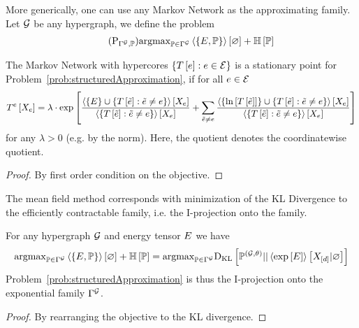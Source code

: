 More generically, one can use any Markov Network as the approximating family. %
Let $\mathcal{G}$ be any hypergraph, we define the problem
\begin{align}\tag{$\mathrm{P}_{\mnexpfamily, \probtensor}$}\label{prob:structuredApproximation}
	\argmax_{\probtensor\in \mnexpfamily} \contractionof{\{\energytensor, \probtensor\}}{\varnothing} + \sentropyof{\probtensor}
\end{align}

\begin{theorem}
	The Markov Network with hypercores $\{ T\left[e\right] : e\in\mathcal{E} \}$ is a stationary point for Problem~\ref{prob:structuredApproximation}, if for all $e\in\mathcal{E}$
	\begin{align*}
	T^{e}\left[X_{e}\right]
	= \lambda\cdot \mathrm{exp}\left[
	\frac{
		\left\langle \{E\}\cup\{
		T\left[\tilde{e}\right] : \tilde{e}\neq e
		\}\right\rangle \left[ X_{e} \right] 
	}{
		\left\langle \{
		T\left[\tilde{e}\right] : \tilde{e}\neq e
		\}\right\rangle \left[ X_{e} \right] 
	}
	+ \sum_{\tilde{e}\neq e} 
		\frac{
		\left\langle \{\ln \left[ T\left[\tilde{e}\right] \right]\}\cup\{
		T\left[\tilde{e}\right] : \tilde{e}\neq e
		\}\right\rangle \left[ X_{e} \right] 
	}{
		\left\langle \{
		T\left[\tilde{e}\right] : \tilde{e}\neq e
		\}\right\rangle \left[ X_{e} \right] 
	}
	\right]
	\end{align*}
	for any $\lambda>0$ (e.g. by the norm).
	Here, the quotient denotes the coordinatewise quotient.
\end{theorem}
\begin{proof}
	By first order condition on the objective.
\end{proof}

The mean field method corresponds with minimization of the KL Divergence to the efficiently contractable family, i.e. the I-projection onto the family.

\begin{theorem}
	For any hypergraph $\mathcal{G}$ and energy tensor $E$ we have 
	\begin{align*}
		\mathrm{argmax}_{\mathbb{P}\in \Gamma^{\mathcal{G}}} \left\langle \{E, \mathbb{P}\}\right\rangle \left[ \varnothing \right] + \mathbb{H}\left[\mathbb{P}\right]
		= \mathrm{argmax}_{\mathbb{P}\in \Gamma^{\mathcal{G}}} \mathrm{D}_{\mathrm{KL}}\left[ \mathbb{P}^{(\mathcal{G},\theta)} || \left\langle \mathrm{exp}\left[E\right]\right\rangle \left[ X_{[d]} | \varnothing \right] \right]
	\end{align*}
	Problem~\ref{prob:structuredApproximation} is thus the I-projection onto the exponential family $\Gamma^{\mathcal{G}}$.
\end{theorem}
\begin{proof}
	By rearranging the objective to the KL divergence.
\end{proof}


